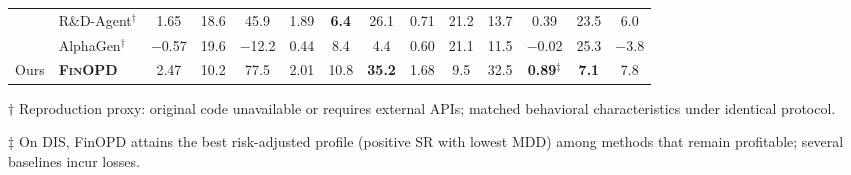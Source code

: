 \begin{table}[t]
\begin{threeparttable}
{\begin{tabular}{clcccccccccccc}
& R\&D-Agent$^\dagger$ & 1.65 & 18.6 & 45.9 & 1.89 & \textbf{\textcolor{FBest}{6.4}} & 26.1 & 0.71 & 21.2 & 13.7 & 0.39 & 23.5 & 6.0 \\
& AlphaGen$^\dagger$ & $-$0.57 & 19.6 & $-$12.2 & 0.44 & 8.4 & 4.4 & 0.60 & 21.1 & 11.5 & $-$0.02 & 25.3 & $-$3.8 \\
\midrule
\multirow{1}{*}{Ours}
& \textbf{\textsc{FinOPD}} & \textcolor{FSecond}{2.47} & 10.2 & \textcolor{FSecond}{77.5} & \textcolor{FSecond}{2.01} & 10.8 & \textbf{\textcolor{FBest}{35.2}} & \textcolor{FSecond}{1.68} & 9.5 & \textcolor{FSecond}{32.5} & \textbf{\textcolor{FBest}{0.89}}$^\ddagger$ & \textbf{\textcolor{FBest}{7.1}} & 7.8 \\
\bottomrule
\end{tabular}
}
\begin{tablenotes}
\footnotesize
\item[$\dagger$] Reproduction proxy: original code unavailable or requires external APIs; matched behavioral characteristics under identical protocol.
\item[$\ddagger$] On DIS, FinOPD attains the best risk-adjusted profile (positive SR with lowest MDD) among methods that remain profitable; several baselines incur losses.
\end{tablenotes}
\end{threeparttable}
\label{tab:per_asset}
\end{table}
